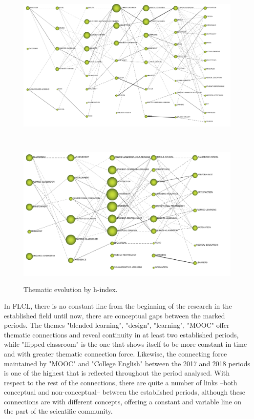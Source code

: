 \documentclass{textolivre-html}
\begin{document}
\begin{figure}[htbp]
 \begin{minipage}{\textwidth}
 \includegraphics[width=\textwidth]{Fig05a.png}
 \label{fig05a}
 \end{minipage}
 \\
 \begin{minipage}{\textwidth}
 \includegraphics[width=\textwidth]{Fig05b.png}
 \label{fig05b}
 \end{minipage}
 \caption{Thematic evolution by h-index.}
 \label{fig05}
\end{figure}

In FLCL, there is no constant line from the beginning of the research in the established field until now, there are conceptual gaps between the marked periods. The themes "blended learning", "design", "learning", "MOOC" offer thematic connections and reveal continuity in at least two established periods, while "flipped classroom" is the one that shows itself to be more constant in time and with greater thematic connection force. Likewise, the connecting force maintained by "MOOC" and "College English" between the 2017 and 2018 periods is one of the highest that is reflected throughout the period analysed. With respect to the rest of the connections, there are quite a number of links –both conceptual and non-conceptual– between the established periods, although these connections are with different concepts, offering a constant and variable line on the part of the scientific community.
\end{document}

